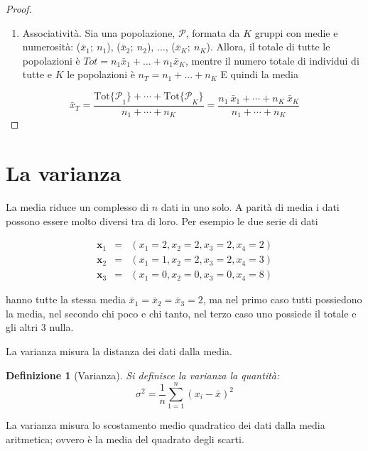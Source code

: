 \documentclass[
  11pt,
]{book}
\providecommand{\tightlist}{%
  \setlength{\itemsep}{0pt}\setlength{\parskip}{0pt}}
\theoremstyle{mytheoremstyle}
\theoremstyle{mydefstyle}
\newtheorem{definition}{Definizione}[section]
\begin{document}
\begin{proof}
\begin{enumerate}
\def\labelenumi{\arabic{enumi}.}
\setcounter{enumi}{4}
\tightlist
\item
  Associatività. Sia una popolazione, \(\mathscr{P}\), formata da \(K\)
  gruppi con medie e numerosità: (\(\bar{x}_{1};\ n_{1}\)),
  (\(\bar{x}_{2};\ n_{2}\)), \(\ldots\), (\(\bar{x}_{K};\ n_{K}\)). Allora,
  il totale di tutte le popolazioni è \(Tot=n_1\bar x_1+...+n_1\bar x_K\), mentre
  il numero totale di individui di tutte e \(K\) le popolazioni è \(n_T=n_1+...+n_K\)
  E quindi la media
\end{enumerate}

\[
  \bar{x}_{T}
= \frac{\mbox{Tot}{ \{\mathscr{P}}_1\} +  \cdots +
        \mbox{Tot}{ \{\mathscr{P}}_K\}} {n_{1} + \cdots + n_{K}}
= \frac{n_{1}\ \bar{x}_{1} + \cdots + n_{K}\ \bar{x}_{K}}
       {n_{1} + \cdots + n_{K}}
\]
\end{proof}

\section{La varianza}\label{var}

La media riduce un complesso di \(n\) dati in uno solo. A parità di media
i dati possono essere molto diversi tra di loro. Per esempio le due serie di dati

\begin{eqnarray*}
  \mathbf{x}_1 &=&  (x_1 =2,x_2=2,x_3=2,x_4=2)\\
  \mathbf{x}_2 &=&  (x_1 =1,x_2=2,x_3=2,x_4=3)\\
  \mathbf{x}_3 &=&  (x_1 =0,x_2=0,x_3=0,x_4=8)
\end{eqnarray*}

hanno tutte la stessa media \(\bar x_1=\bar x_2 =\bar x_3= 2\), ma nel primo caso tutti possiedono
la media, nel secondo chi poco e chi tanto, nel terzo caso uno possiede il totale e gli altri 3 nulla.

La varianza misura la distanza dei dati dalla media.

\begin{info}

\begin{definition}[Varianza]
Si definisce la varianza la quantità:
\[
\sigma^2=\frac 1 n \sum_{1=1}^n(x_i-\bar x)^2
\]
\end{definition}

\end{info}

La varianza misura lo scostamento medio quadratico dei dati dalla media aritmetica;
ovvero è la media del quadrato degli scarti.
\end{document}
